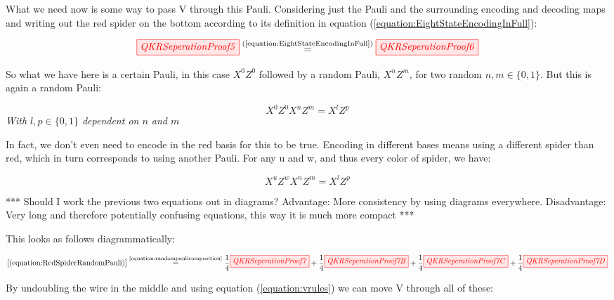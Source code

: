 \documentclass[]{article}
\newcommand{\equaltext}[1]{\ensuremath{\stackrel{\text{#1}}{=}}}
\begin{document}
What we need now is some way to pass V through this Pauli. Considering just the Pauli and the surrounding encoding and decoding maps and writing out the red spider on the bottom according to its definition in equation (\ref{equation:EightStateEncodingInFull}):

\begin{equation}
	\label{equation:RedSpiderRandomPauli}
	\tikzfig{QKRSeperationProof5} \equaltext{(\ref{equation:EightStateEncodingInFull})} \tikzfig{QKRSeperationProof6}
\end{equation}

So what we have here is a certain Pauli, in this case $X^0Z^0$ followed by a random Pauli, $X^nZ^m$, for two random $n, m \in \{0,1\}$. But this is again a random Pauli:

\begin{equation}
\label{equation:randompaulicomposition}
X^0Z^0X^nZ^m = X^lZ^p
\end{equation}
\textit{With $l, p \in \{0,1\}$ dependent on $n$ and $m$}

In fact, we don't even need to encode in the red basis for this to be true. Encoding in different bases means using a different spider than red, which in turn corresponds to using another Pauli. For any u and w, and thus every color of spider, we have:

\begin{equation}
X^uZ^wX^nZ^m = X^lZ^p
\end{equation}

*** Should I work the previous two equations out in diagrams? Advantage: More consistency by using diagrams everywhere. Disadvantage: Very long and therefore potentially confusing equations, this way it is much more compact ***

This looks as follows diagrammatically:

\begin{equation}
	\label{equation:fourcolourspiders}
	\ref{(equation:RedSpiderRandomPauli)} \equaltext{\ref{equation:randompaulicomposition}} \frac{1}{4}\tikzfig{QKRSeperationProof7} + \frac{1}{4} \tikzfig{QKRSeperationProof7B} + \frac{1}{4} \tikzfig{QKRSeperationProof7C} + \frac{1}{4} \tikzfig{QKRSeperationProof7D}
\end{equation}

By undoubling the wire in the middle and using equation (\ref{equation:vrules}) we can move V through all of these:
\end{document}
